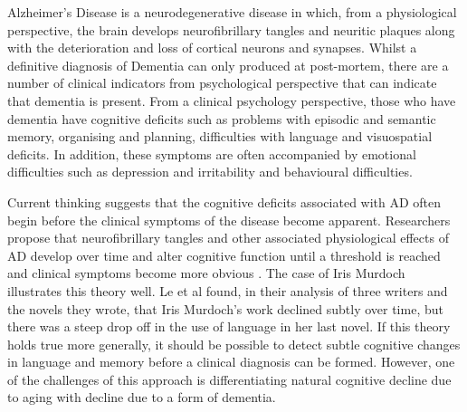 \documentclass{article}
\begin{document}
\par
Alzheimer's Disease is a neurodegenerative disease in which, from a physiological perspective, the brain develops neurofibrillary tangles and neuritic plaques along with the deterioration and loss of cortical neurons and synapses. Whilst a definitive diagnosis of Dementia can only produced at post-mortem, there are a number of clinical indicators from psychological perspective that can indicate that dementia is present. From a clinical psychology perspective, those who have dementia have cognitive deficits such as problems with episodic and semantic memory, organising and planning, difficulties with language and visuospatial deficits\cite{AmericanPsychiatricAssociation2013}. In addition, these symptoms are often accompanied by emotional difficulties such as depression and irritability and behavioural difficulties. \newline
\par
Current thinking suggests that the cognitive deficits associated with AD often begin before the clinical symptoms of the disease become apparent. Researchers propose that neurofibrillary tangles and other associated physiological effects of AD develop over time and alter cognitive function until a threshold is reached and clinical symptoms become more obvious \cite{Nestor2006}. The case of Iris Murdoch illustrates this theory well. Le et al \cite{Le2012}found, in their analysis of three writers and the novels they wrote, that Iris Murdoch's work declined subtly over time, but there was a steep drop off in the use of language in her last novel. If this theory holds true more generally, it should be possible to detect subtle cognitive changes in language and memory before a clinical diagnosis can be formed. However, one of the challenges of this approach is differentiating natural cognitive decline due to aging with decline due to a form of dementia.\newline
\par
\end{document}
